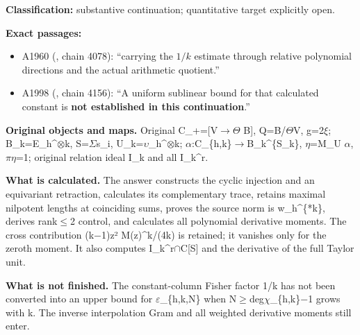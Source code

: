 \textbf{Classification:} substantive continuation; quantitative target
explicitly open.

\textbf{Exact passages:}

\begin{itemize}
\tightlist
\item
  A1960 (\protect{}, chain
  4078): ``carrying the \(1/k\) estimate through relative polynomial
  directions and the actual arithmetic quotient.''
\item
  A1998 (\protect{}, chain
  4156): ``A uniform sublinear bound for that calculated constant is
  \textbf{not established in this continuation}.''
\end{itemize}

\textbf{Original objects and maps.} Original
C\_+=[V\allowbreak{}\ensuremath{→}\allowbreak{}\allowbreak{}\ensuremath{Θ}\allowbreak{}
B{]}, Q=B/\allowbreak{}\ensuremath{Θ}\allowbreak{}V,
g=2\allowbreak{}\ensuremath{ξ}\allowbreak{};
B\_k=E\_h\textasciicircum{}\allowbreak{}\ensuremath{⊗}\allowbreak{}k,
S=\allowbreak{}\ensuremath{Σ}\allowbreak{}s\_i,
U\_k=\allowbreak{}\ensuremath{υ}\allowbreak{}\_h\textasciicircum{}\allowbreak{}\ensuremath{⊗}\allowbreak{}k;
\allowbreak{}\ensuremath{α}\allowbreak{}:C\_\{h,k\}\allowbreak{}\ensuremath{→}\allowbreak{}B\_k\textasciicircum{}\{S\_k\},
\allowbreak{}\ensuremath{η}\allowbreak{}=M\_U
\allowbreak{}\ensuremath{α}\allowbreak{},
\allowbreak{}\ensuremath{π}\allowbreak{}\allowbreak{}\ensuremath{η}\allowbreak{}=1;
original relation ideal I\_k and all I\_k\^{}r.

\textbf{What is calculated.} The answer constructs the cyclic injection
and an equivariant retraction, calculates its complementary trace,
retains maximal nilpotent lengths at coinciding sums, proves the source
norm is w\_h\^{}\{*k\}, derives
rank\allowbreak{}\ensuremath{≤}\allowbreak{}2 control, and calculates
all polynomial derivative moments. The cross contribution
(k\allowbreak{}\ensuremath{−}\allowbreak{}1)z² M(z)\^{}k/(4k) is
retained; it vanishes only for the zeroth moment. It also computes
I\_k\textasciicircum{}r\allowbreak{}\ensuremath{∩}\allowbreak{}C[S] and
the derivative of the full Taylor unit.

\textbf{What is not finished.} The constant-column Fisher factor 1/k has
not been converted into an upper bound for
\allowbreak{}\ensuremath{ε}\allowbreak{}\_\{h,k,N\} when
N\allowbreak{}\ensuremath{≥}\allowbreak{}deg\allowbreak{}\ensuremath{χ}\allowbreak{}\_\{h,k\}\allowbreak{}\ensuremath{−}\allowbreak{}1
grows with k. The inverse interpolation Gram and all weighted derivative
moments still enter.

